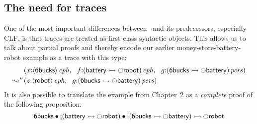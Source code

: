 \subsection{The need for traces}
\label{sec:whytraces}

One of the most important differences between \sls~and its
predecessors, especially CLF, is that traces are treated as
first-class syntactic objects. This allows us to talk about 
partial proofs and thereby encode our earlier 
money-store-battery-robot example as a trace with this type:
\begin{align*}
& \left(
 x{:}{\langle {\sf 6bucks} \rangle}\,{{\it eph}}, ~~
 f{:}{({\sf battery} \rightarrowtail {\ocircle}{\sf robot})}\,{{\it eph}}, ~~
 g{:}{({\sf 6bucks} \rightarrowtail {\ocircle}{\sf battery})}\,{{\it pers}}
\right)
\\
\leadsto^* &
\left(
 z{:}{\langle {\sf robot} \rangle}\,{{\it eph}}, ~~
 g{:}{({\sf 6bucks} \rightarrowtail {\ocircle}{\sf battery})}\,{{\it pers}}
\right)
\end{align*}
It is also possible to translate the example from Chapter~2
as a {\it complete} proof of the following proposition:
\[
  {\sf 6bucks} 
      \fuse {\gnab}({\sf battery} \lefti {\ocircle}{\sf robot})
      \fuse {!}({\sf 6bucks} \lefti {\ocircle}{\sf battery})
     \lefti
     {\ocircle}{\sf robot}
\]

